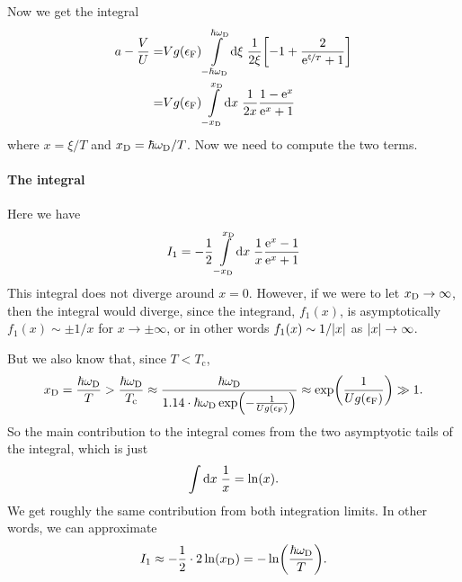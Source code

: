 \documentclass[11pt,letter, swedish, english
]{article}
\newcommand{\Tc}{\ensuremath{T_{\text{c}}}}
\newcommand{\eF}{\ensuremath{\epsilon_{\text{F}}}}
\newcommand{\wD}{\ensuremath{\omega_{\text{D}}}}
\begin{document}
Now we get the integral
\begin{equation}  %
\begin{aligned}\label{eq:2a_a_int}
a-\frac{V}{U}=&
Vg(\eF)\int_{-\hbar\wD}^{\hbar\wD}\!\rd\xi\;
\frac{1}{2\xi}\qty[-1
+\frac{2}{\ee^{\nicefrac{\xi}{T}}+1}]
\\
=&Vg(\eF)\int_{-\xD}^{\xD}\!\rd{x}\;
\frac{1}{2x}\frac{1-\ee^x}{\ee^x+1}
\end{aligned}
\end{equation}
where $x=\xi/T$ and $\xD=\hbar\wD/T$. Now we need to compute the
two terms.

\paragraph{The integral}
Here we have
\vspace{-11pt}\begin{equation}
I_1=-\frac{1}{2}\int_{-\xD}^{\xD}\!\rd{x}\;
\frac{1}{x}
\frac{\ee^x-1}{\ee^x+1}
\end{equation}
This integral does not diverge around $x=0$. However, if we were to let
$x_{\text{D}}\to\infty$, then the integral would diverge, since the integrand, $f_1(x)$,
is asymptotically $f_1(x)\sim\pm1/x$ for $x\to\pm\infty$, or in other
words $f_1(x)\sim1/\abs{x}$ as $\abs{x}\to\infty$. 

But we also know that, since $T<\Tc$,
\begin{equation}\label{eq:2_xD}
\xD=\frac{\hbar\wD}{T}>\frac{\hbar\wD}{\Tc}
\approx\frac{\hbar\wD}{1.14\cdot\hbar\wD\exp(-\frac{1}{Ug(\eF)})}
\approx\exp(\frac{1}{Ug(\eF)})\gg1.
\end{equation}
So the main contribution to the integral comes from the two
asymptyotic tails of the integral, which is just
\begin{equation}
\int\rd{x}\;\frac{1}{x}=\ln(x).
\end{equation}
We get roughly the same contribution from both integration limits.
In other words, we can approximate
\begin{equation}\label{eq:2a_I1_0}
I_1\approx -\frac{1}{2}\cdot2\ln(\xD)=-\ln(\frac{\hbar\wD}{T}).
\end{equation}
\end{document}
